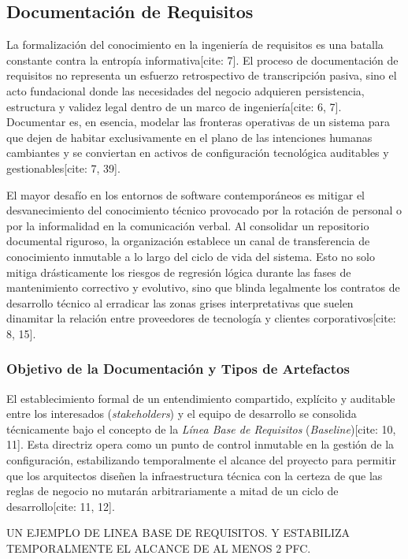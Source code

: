 \documentclass[11pt,a4paper]{article}
\begin{document}
	\subsection{Documentación de Requisitos}
	La formalización del conocimiento en la ingeniería de requisitos es una batalla constante contra la entropía informativa[cite: 7]. El proceso de documentación de requisitos no representa un esfuerzo retrospectivo de transcripción pasiva, sino el acto fundacional donde las necesidades del negocio adquieren persistencia, estructura y validez legal dentro de un marco de ingeniería[cite: 6, 7]. Documentar es, en esencia, modelar las fronteras operativas de un sistema para que dejen de habitar exclusivamente en el plano de las intenciones humanas cambiantes y se conviertan en activos de configuración tecnológica auditables y gestionables[cite: 7, 39].
	
	El mayor desafío en los entornos de software contemporáneos es mitigar el desvanecimiento del conocimiento técnico provocado por la rotación de personal o por la informalidad en la comunicación verbal. Al consolidar un repositorio documental riguroso, la organización establece un canal de transferencia de conocimiento inmutable a lo largo del ciclo de vida del sistema. Esto no solo mitiga drásticamente los riesgos de regresión lógica durante las fases de mantenimiento correctivo y evolutivo, sino que blinda legalmente los contratos de desarrollo técnico al erradicar las zonas grises interpretativas que suelen dinamitar la relación entre proveedores de tecnología y clientes corporativos[cite: 8, 15].
	
	\subsubsection{Objetivo de la Documentación y Tipos de Artefactos}
	El establecimiento formal de un entendimiento compartido, explícito y auditable entre los interesados (\textit{stakeholders}) y el equipo de desarrollo se consolida técnicamente bajo el concepto de la \textit{Línea Base de Requisitos} (\textit{Baseline})[cite: 10, 11]. Esta directriz opera como un punto de control inmutable en la gestión de la configuración, estabilizando temporalmente el alcance del proyecto para permitir que los arquitectos diseñen la infraestructura técnica con la certeza de que las reglas de negocio no mutarán arbitrariamente a mitad de un ciclo de desarrollo[cite: 11, 12].
	
	UN EJEMPLO DE LINEA BASE DE REQUISITOS. Y ESTABILIZA TEMPORALMENTE EL ALCANCE DE AL MENOS 2 PFC.
	
\end{document}
